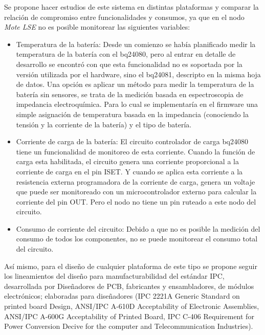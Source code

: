 \noindent Se propone hacer estudios de este sistema en distintas plataformas y comparar la relación de compromiso entre funcionalidades y consumos, ya que en el nodo \textit{Mote LSE} no es posible monitorear las siguientes variables:
\begin{itemize}

\item Temperatura de la batería: Desde un comienzo se había planificado medir la temperatura de la batería con el bq24080, pero al entrar en detalle de desarrollo se encontró con que esta funcionalidad no es soportada por la versión utilizada por el hardware, sino el bq24081, descripto en la misma hoja de datos. Una opción es aplicar un método para medir la temperatura de la batería sin sensores, se trata de la medición basada en espectroscopia de impedancia electroquímica\citep{metodo}. Para lo cual se implementaría en el firmware una simple asignación de temperatura basada en la impedancia (conociendo la tensión y la corriente de la batería) y el tipo de batería.

\item Corriente de carga de la batería: El circuito controlador de carga bq24080 tiene un funcionalidad de monitoreo de esta corriente. Cuando la función de carga esta habilitada, el circuito genera una corriente proporcional a la corriente de carga en el pin ISET.  Y cuando se aplica esta corriente a la resistencia externa programadora de la corriente de carga, genera un voltaje que puede ser monitoreado con un microcontrolador externo para calcular la corriente del pin OUT. Pero el nodo no tiene un pin ruteado a este nodo del circuito.

\item Consumo de corriente del circuito: Debido a que no es posible la medición del consumo de todos los componentes, no se puede monitorear el consumo total del circuito.
\end{itemize}

Así mismo, para el diseño de cualquier plataforma de este tipo se propone seguir los lineamientos del diseño para manufacturabilidad del estándar IPC, desarrollada por Diseñadores de PCB, fabricantes y ensambladores, de módulos electrónicos; elaboradas para diseñadores (IPC 2221A Generic Standard on printed board Design, ANSI/IPC A-610D Acceptability of Electronic Assemblies, ANSI/IPC A-600G Acceptability of Printed Board, IPC C-406 Requirement for Power Conversion Decive for the computer and Telecommunication Industries).










